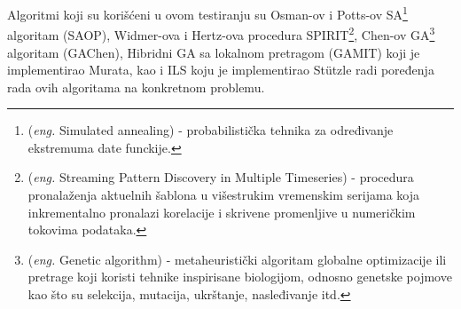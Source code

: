 \documentclass[a4paper]{article}
\newcommand{\eng}[1]{(\textit{eng.} #1)}
\begin{document}
  
  Algoritmi koji su korišćeni u ovom testiranju su Osman-ov i Potts-ov SA\footnote{ \eng{Simulated annealing} - probabilistička tehnika za određivanje ekstremuma date funckije.} algoritam (SAOP), Widmer-ova i Hertz-ova procedura SPIRIT\footnote{ \eng{Streaming Pattern Discovery in Multiple Timeseries} - procedura pronalaženja aktuelnih šablona u višestrukim vremenskim serijama koja inkrementalno pronalazi korelacije i skrivene promenljive u numeričkim tokovima podataka.}, Chen-ov GA\footnote{ \eng{Genetic algorithm} - metaheuristički algoritam globalne optimizacije ili pretrage koji koristi tehnike inspirisane biologijom, odnosno genetske pojmove kao što su selekcija, mutacija, ukrštanje, nasleđivanje itd.} algoritam (GAChen), Hibridni GA sa lokalnom pretragom (GAMIT) koji je implementirao Murata, kao i ILS koju je implementirao Stützle radi poređenja rada ovih algoritama na konkretnom problemu.
 
\end{document}
